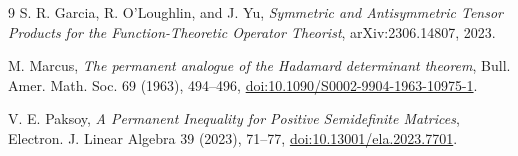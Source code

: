 \documentclass[11pt]{article}
\begin{document}
\begin{thebibliography}{9}
S. R. Garcia, R. O'Loughlin, and J. Yu,
\emph{Symmetric and Antisymmetric Tensor Products for the Function-Theoretic
Operator Theorist}, arXiv:2306.14807, 2023.

M. Marcus,
\emph{The permanent analogue of the Hadamard determinant theorem},
Bull. Amer. Math. Soc. 69 (1963), 494--496,
\href{https://doi.org/10.1090/S0002-9904-1963-10975-1}{doi:10.1090/S0002-9904-1963-10975-1}.

V. E. Paksoy,
\emph{A Permanent Inequality for Positive Semidefinite Matrices},
Electron. J. Linear Algebra 39 (2023), 71--77,
\href{https://doi.org/10.13001/ela.2023.7701}{doi:10.13001/ela.2023.7701}.
\end{thebibliography}
\end{document}
